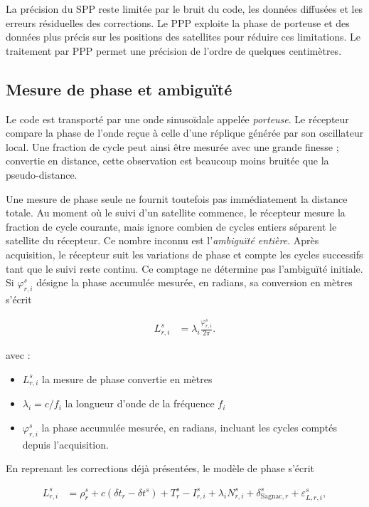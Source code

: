 La précision du SPP reste limitée par le bruit du code, les données
diffusées et les erreurs résiduelles des corrections. Le PPP exploite la
phase de porteuse et des données plus précis sur les positions des satellites pour réduire ces limitations.
Le traitement par PPP permet une précision de l'ordre de quelques centimètres.

\subsection{Mesure de phase et ambiguïté}
\label{new:phase_section}

Le code est transporté par une onde sinusoïdale appelée \emph{porteuse}. Le
récepteur compare la phase de l'onde reçue à celle d'une réplique générée par
son oscillateur local. Une fraction de cycle peut ainsi être mesurée avec une grande
finesse ; convertie en distance, cette observation est beaucoup moins bruitée
que la pseudo-distance.

Une mesure de phase seule ne fournit toutefois pas immédiatement la distance
totale. Au moment où le suivi d'un satellite commence, le récepteur mesure la
fraction de cycle courante, mais ignore combien de cycles entiers séparent le
satellite du récepteur. Ce nombre inconnu est l'\emph{ambiguïté entière}. Après acquisition, le récepteur suit les variations de phase et compte les
cycles successifs tant que le suivi reste continu. Ce comptage ne détermine
pas l'ambiguïté initiale. Si $\varphi_{r,i}^s$ désigne la phase accumulée
mesurée, en radians, sa conversion en mètres s'écrit

\begin{align}
L_{r,i}^s
&=
\lambda_i\frac{\varphi_{r,i}^s}{2\pi}.
\label{eq:carrier_phase_definition}
\end{align}

avec :

\begin{itemize}
    \item $L_{r,i}^s$ la mesure de phase convertie en mètres 
    \item $\lambda_i=c/f_i$ la longueur d'onde de la fréquence $f_i$
    \item $\varphi_{r,i}^s$ la phase accumulée mesurée, en radians,
    incluant les cycles comptés depuis l'acquisition.
\end{itemize}

En reprenant les corrections déjà présentées,
le modèle de phase s'écrit~\cite[p.~591]{capderou2012}

\begin{align}
L_{r,i}^s
&=
\rho_r^s
+c\left(\delta t_r-\delta t^s\right)
+T_r^s
-I_{r,i}^s
+\lambda_i N_{r,i}^s
+\delta_{\mathrm{Sagnac},r}^s
+\varepsilon_{L,r,i}^s,
\label{new:phase}
\end{align}

